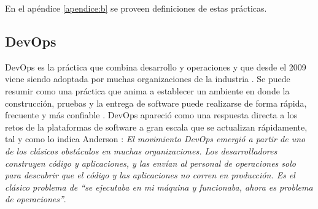 \documentclass[journal]{IEEEtran}
\begin{document}
En el apéndice \ref{apendice:b} se proveen definiciones de estas prácticas.

\subsection{DevOps}
DevOps es la práctica que combina desarrollo y operaciones y que desde el 2009 viene siendo adoptada por muchas organizaciones de la industria \cite{bang-et-al}. Se puede resumir como una práctica que anima a establecer un ambiente en donde la construcción, pruebas y la entrega de software puede realizarse de forma rápida, frecuente y más confiable \cite{henrik-b}. DevOps apareció como una respuesta directa a los retos de la  plataformas de software a gran escala que se actualizan rápidamente, tal y como lo indica Anderson \cite{anderson}: \emph{El movimiento DevOps emergió a partir de uno de los clásicos obstáculos en muchas organizaciones. Los desarrolladores construyen código y aplicaciones, y las envían al personal de operaciones solo para descubrir que el código y las aplicaciones no corren en producción. Es el clásico problema de ``se ejecutaba en mi máquina y funcionaba, ahora es problema de operaciones''}. 
\end{document}
